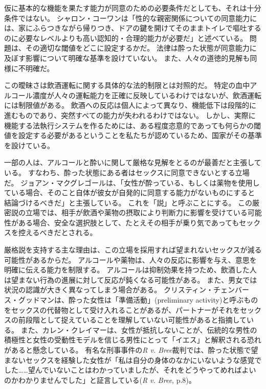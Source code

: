 \documentclass[paper=a4,book,openany]{jlreq}
\newcommand{\ig}[1]{}           %
\begin{document}
仮に基本的な機能を果たす能力が同意のための必要条件だとしても、それは十分条件ではない。
シャロン・コーワン\ig{Cowan}は「性的な親密関係についての同意能力には、家にふらつきながら帰りつき、ドアの鍵を開けてそのままトイレで嘔吐するのに必要なレベルよりも高い認知的・合理的能力が必要だ」と述べている\citep[p.919]{cowan08:_troub_drink}。
問題は、その適切な閾値をどこに設定するかだ。
法律は酔った状態が同意能力に及ぼす影響について明確な基準を設けていない。
また、人々の道徳的見解も同様に不明確だ。

この曖昧さは飲酒運転に関する具体的な法的制限とは対照的だ。
特定の血中アルコール濃度が人々の運転能力を正確に反映しているわけではないが、飲酒運転には制限値がある。
飲酒への反応は個人によって異なり、機能低下は段階的に進むものであり、突然すべての能力が失われるわけではない。
しかし、実際に機能する法執行システムを作るためには、ある程度恣意的であっても何らかの閾値を設定する必要があるということを私たちが認めているため、国家がその基準を設けている。

一部の人は、アルコールと酔いに関して厳格な見解をとるのが最善だと主張している。
すなわち、酔った状態にある者はセックスに同意できないとする立場だ。
ジョアン・マクグレゴール\ig{Joan MacGregor}は、「女性が酔っている、もしくは薬物を使用している場合、そのこと自体が彼女が自発的に同意する能力がないものにすると結論づけるべきだ」と主張している\citep[pp.244--245]{macgregor94:_force_consen_reason_woman}。
これを「説」と呼ぶことにする。
この厳密説の立場では、相手が飲酒や薬物の摂取により判断力に影響を受けている可能性がある場合、安全な選択肢として、たとえその相手が乗り気であってもセックスを控えるべきだとされる。

厳格説を支持する主な理由は、この立場を採用すれば望まれないセックスが減る可能性があるからだ。
アルコールや薬物は、人々の反応に影響を与え、意思を明確に伝える能力を制限する\citep{koss89:_discr_analy_risk_factor_sexual}。
アルコールは抑制効果を持つため、飲酒した人は望まない行為の進展に対して反応が鈍くなる可能性がある。
また、男女では状況の認識が大きく異なってしまう場合がある。
クリスティン・チェンバース・グッドマン\ig{Christine Chambers Goodman}は、酔った女性は「準備活動」(preliminary activity)と呼ぶものをセックスの代替物として受け入れることがあるが、パートナーがそれをセックスの前段階として捉えていることを理解していない可能性があると指摘している\citep[p.79]{goodman09:_protec_party_girl}。
また、カレン・クレイマーは、女性が抵抗しないことが、伝統的な男性の積極性と女性の受動性モデルを信じる男性にとって「イエス」と解釈される恐れがあると懸念している\citep[p.121]{kramer94:_rule_myth}。
有名な刑事事件の\emph{R v. Bree}裁判では、酔った状態で望まないセックスを経験した女性が「私は自分の身体のなかにいないような感覚でした……望んでいないことはわかっていましたが、それをどうやってめればよいのかわかりませんでした」と証言している(\emph{R v. Bree}, p.8)。
\end{document}
